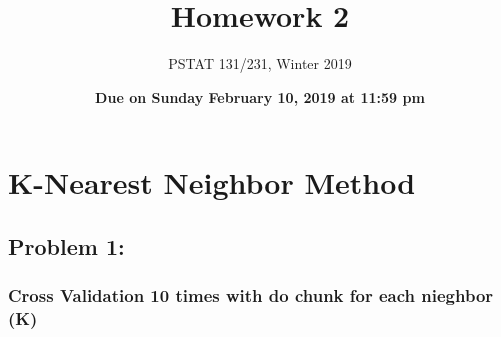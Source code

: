 \documentclass[]{article}
\title{Homework 2}
\author{PSTAT 131/231, Winter 2019}
\date{\textbf{Due on Sunday February 10, 2019 at 11:59 pm}}
\newenvironment{Shaded}{\begin{snugshade}}{\end{snugshade}}
\newcommand{\CommentTok}[1]{\textcolor[rgb]{0.56,0.35,0.01}{\textit{#1}}}
\newcommand{\DataTypeTok}[1]{\textcolor[rgb]{0.13,0.29,0.53}{#1}}
\newcommand{\DecValTok}[1]{\textcolor[rgb]{0.00,0.00,0.81}{#1}}
\newcommand{\KeywordTok}[1]{\textcolor[rgb]{0.13,0.29,0.53}{\textbf{#1}}}
\newcommand{\NormalTok}[1]{#1}
\newcommand{\OperatorTok}[1]{\textcolor[rgb]{0.81,0.36,0.00}{\textbf{#1}}}
\newcommand{\StringTok}[1]{\textcolor[rgb]{0.31,0.60,0.02}{#1}}
\begin{document}
\maketitle

\begin{Shaded}
\end{Shaded}

\hypertarget{k-nearest-neighbor-method}{%
\section{K-Nearest Neighbor Method}\label{k-nearest-neighbor-method}}

\hypertarget{problem-1}{%
\subsection{Problem 1:}\label{problem-1}}

\hypertarget{cross-validation-10-times-with-do-chunk-for-each-nieghbor-k}{%
\subsubsection{Cross Validation 10 times with do chunk for each nieghbor
(K)}\label{cross-validation-10-times-with-do-chunk-for-each-nieghbor-k}}
\end{document}

